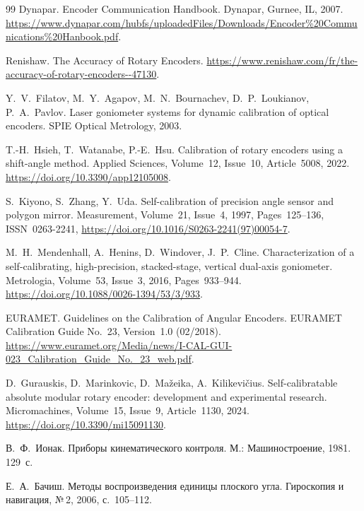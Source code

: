 \documentclass[14pt,a4paper]{extarticle}
\begin{document}
\clearpage
%
\begin{thebibliography}{99}
Dynapar.
Encoder Communication Handbook.
Dynapar, Gurnee, IL,
2007.
\url{https://www.dynapar.com/hubfs/uploadedFiles/Downloads/Encoder%20Communications%20Hanbook.pdf}.

Renishaw.
The Accuracy of Rotary Encoders.
\url{https://www.renishaw.com/fr/the-accuracy-of-rotary-encoders--47130}.

Y.~V.~Filatov, M.~Y.~Agapov, M.~N.~Bournachev, D.~P.~Loukianov, P.~A.~Pavlov.
Laser goniometer systems for dynamic calibration of optical encoders.
SPIE Optical Metrology,
2003.

T.-H.~Hsieh, T.~Watanabe, P.-E.~Hsu.
Calibration of rotary encoders using a shift-angle method.
Applied Sciences,
Volume~12, Issue~10,
Article~5008,
2022.
\url{https://doi.org/10.3390/app12105008}.

S.~Kiyono, S.~Zhang, Y.~Uda.
Self-calibration of precision angle sensor and polygon mirror.
Measurement,
Volume~21, Issue~4,
1997,
Pages~125--136,
ISSN~0263-2241,
\url{https://doi.org/10.1016/S0263-2241(97)00054-7}.

M.~H.~Mendenhall, A.~Henins, D.~Windover, J.~P.~Cline.
Characterization of a self-calibrating, high-precision, stacked-stage,
vertical dual-axis goniometer.
Metrologia,
Volume~53, Issue~3,
2016,
Pages~933--944.
\url{https://doi.org/10.1088/0026-1394/53/3/933}.

EURAMET.
Guidelines on the Calibration of Angular Encoders.
EURAMET Calibration Guide No.~23,
Version~1.0 (02/2018).
\url{https://www.euramet.org/Media/news/I-CAL-GUI-023_Calibration_Guide_No._23_web.pdf}.

D.~Gurauskis, D.~Marinkovic, D.~Mažeika, A.~Kilikevičius.
Self-calibratable absolute modular rotary encoder:
development and experimental research.
Micromachines,
Volume~15, Issue~9,
Article~1130,
2024.
\url{https://doi.org/10.3390/mi15091130}.

В.~Ф.~Ионак.
Приборы кинематического контроля.
М.: Машиностроение, 1981.
129~с.

Е.~А.~Бачиш.
Методы воспроизведения единицы плоского угла.
Гироскопия и навигация,
№\,2,
2006,
с.~105--112.


\end{thebibliography}
\end{document}
